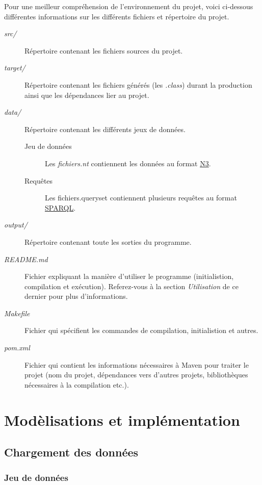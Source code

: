 \documentclass[12pt,titlepage]{article}
\begin{document}
Pour une meilleur compréhension de l'environnement du projet, voici ci-dessous différentes informations sur les différents fichiers et répertoire du projet.

\begin{description}
	\item[\textit{src/}] Répertoire contenant les fichiers sources du projet.
	\item[\textit{target/}] Répertoire contenant les fichiers générés (les \textit{.class}) durant la production ainsi que les dépendances lier au projet.
	\item[\textit{data/}] Répertoire contenant les différents jeux de données.
	\begin{description}
		\item[Jeu de données] Les \textit{fichiers.nt} contiennent les données au format \href{https://fr.wikipedia.org/wiki/Notation3}{N3}.
		\item[Requêtes] Les {fichiers.queryset} contiennent plusieurs requêtes au format \href{https://fr.wikipedia.org/wiki/SPARQL}{SPARQL}.
	\end{description}
		\item[\textit{output/}] Répertoire contenant toute les sorties du programme.	
		\item[\textit{README.md}] Fichier expliquant la manière d'utiliser le programme (initialistion, compilation et exécution). Referez-vous à la section \textit{Utilisation} de ce dernier pour plus d'informations.
		\item[\textit{Makefile}] Fichier qui spécifient les commandes de compilation, initialistion et autres.
		\item[\textit{pom.xml}] Fichier qui contient les informations nécessaires à Maven pour traiter le projet (nom du projet, dépendances vers d'autres projets, bibliothèques nécessaires à la compilation etc.).
\end{description}

\section{Modèlisations et implémentation}

\subsection{Chargement des données}

\subsubsection{Jeu de données}
\end{document}
